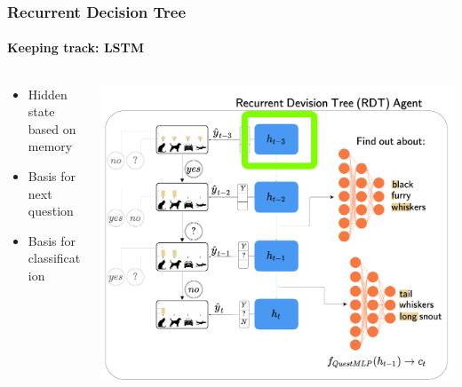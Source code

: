 \documentclass[9pt]{beamer}
\begin{document}
\begin{frame}
\frametitle{Recurrent Decision Tree}
\framesubtitle{Keeping track: LSTM}
\begin{columns}[T]
\begin{column}{.5\textwidth}
\begin{itemize}
	\item Hidden state based on memory
	\item Basis for next question
	\item Basis for classification
\end{itemize}
\end{column}
\begin{column}{.5\textwidth}
\includegraphics[width=\textwidth]{images/urdtc_parts_lstm.pdf}
\end{column}
\end{columns}
\end{frame}
\end{document}
